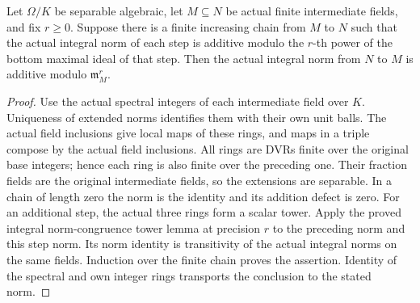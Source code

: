 \begin{lemma}
\label{fw:actual-field-norm-congruence-chain}
\leanok
Let $\Omega/K$ be separable algebraic, let $M\subseteq N$ be
actual finite intermediate fields, and fix $r\geq0$. Suppose there is a
finite increasing chain from $M$ to $N$ such that the actual
integral norm of each step is additive modulo the $r$-th power
of the bottom maximal ideal of that step. Then the actual
integral norm from $N$ to $M$ is additive modulo
$\mathfrak m_M^r$.
\end{lemma}
\begin{proof}
Use the actual spectral integers of each intermediate field over
$K$. Uniqueness of extended norms identifies them with their own
unit balls. The actual field inclusions give local maps of these
rings, and maps in a triple compose by the actual field inclusions.
All rings are DVRs finite over the original base integers; hence
each ring is also finite over the preceding one. Their fraction
fields are the original intermediate fields, so the extensions
are separable. In a chain of length zero the norm is the identity
and its addition defect is zero. For an additional step, the
actual three rings form a scalar tower. Apply the proved integral
norm-congruence tower lemma at precision $r$ to the preceding
norm and this step norm. Its norm identity is transitivity of
the actual integral norms on the same fields. Induction over the
finite chain proves the assertion. Identity of the spectral and
own integer rings transports the conclusion to the stated norm.
\end{proof}

